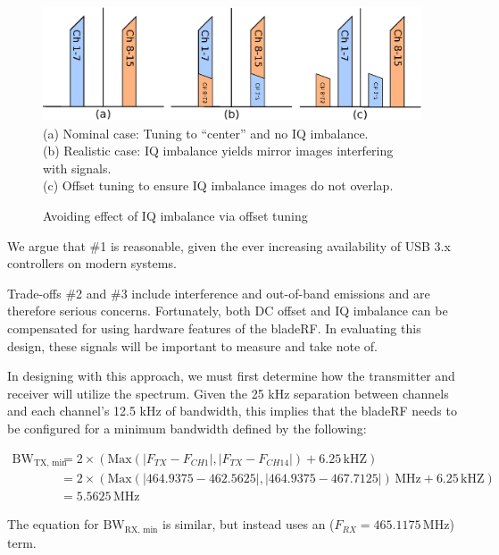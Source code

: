 \begin{figure}[h]
  \centering
  \includegraphics[width=6in]{images/frs/iq_imbalance_offset_tuning.eps}
  \\
  \footnotesize{
    (a) Nominal case: Tuning to ``center'' and no IQ imbalance.\\
    (b) Realistic case: IQ imbalance yields mirror images interfering with signals.\\
    (c) Offset tuning to ensure IQ imbalance images do not overlap.
  }
  \caption{Avoiding effect of IQ imbalance via offset tuning}
  \label{fig:iq_imbalance}
\end{figure}

We argue that \#1 is reasonable, given the ever increasing availability of USB 3.x controllers on modern systems.

Trade-offs \#2 and \#3 include interference and out-of-band emissions and are
therefore serious concerns. Fortunately, both DC offset and IQ imbalance can be
compensated for using hardware features of the bladeRF. In evaluating this
design, these signals will be important to measure and take note of.

In designing with this approach, we must first determine how the transmitter and
receiver will utilize the spectrum.  Given the 25 kHz separation between
channels and each channel's 12.5 kHz of bandwidth, this implies that the
bladeRF needs to be configured for a minimum bandwidth defined by the
following:

\begin{align*}
  \text{BW}_{\text{TX, min}} &=
  2 \times \left( \text{Max}\left(|F_{TX} - F_{CH1}|, |F_{TX} - F_{CH14}|\right) + 6.25 \,\text{kHZ} \right) \\
  &= 2 \times \left( \text{Max}\left(|464.9375 - 462.5625|, |464.9375 - 467.7125|\right) \, \text{MHz} + 6.25 \,\text{kHZ} \right) \\
  &= 5.5625 \, \text{MHz}
\end{align*}

The equation for $\text{BW}_{\text{RX, min}}$ is similar, but instead uses an
($F_{RX} = 465.1175 \,\text{MHz}$) term.


